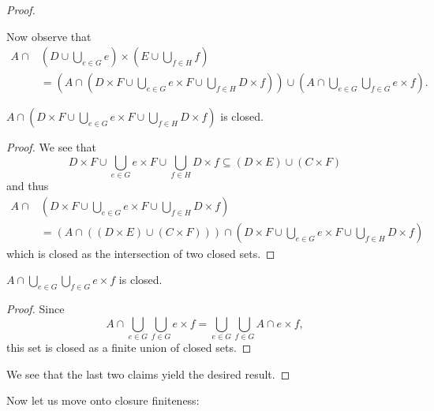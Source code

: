 \begin{proof}
\begin{claim}
    \end{claim}
    Now observe that 
    \begin{align*}
      A \cap &\left( D \cup \bigcup_{e \in G} e \right) \times \left( E \cup \bigcup_{f \in H} f\right) \\
      &= \left( A \cap \left( D \times F \cup \bigcup_{e \in G} e \times F \cup \bigcup_{f \in H} D \times f \right) \right) \cup \left( A \cap \bigcup_{e \in G} \bigcup_{f \in G} e \times f\right).
    \end{align*}
    \begin{claim}
      $A \cap \left( D \times F \cup \bigcup_{e \in G} e \times F \cup \bigcup_{f \in H} D \times f \right)$ is closed. 
      \begin{proof}
        We see that 
        \begin{equation*}
        D \times F \cup \bigcup_{e \in G} e \times F \cup \bigcup_{f \in H} D \times f \subseteq (D \times E) \cup (C \times F)
        \end{equation*}
        and thus 
        \begin{align*}
          A \cap &\left( D \times F \cup \bigcup_{e \in G} e \times F \cup \bigcup_{f \in H} D \times f \right) \\
          &= (A \cap ((D \times E) \cup (C \times F))) \cap \left( D \times F \cup \bigcup_{e \in G} e \times F \cup \bigcup_{f \in H} D \times f \right)
        \end{align*}
        which is closed as the intersection of two closed sets.
      \end{proof}
    \end{claim}
    \begin{claim}
      $A \cap \bigcup_{e \in G} \bigcup_{f \in G} e \times f$ is closed.
      \begin{proof}
        Since
        \begin{equation*}
          A \cap \bigcup_{e \in G} \bigcup_{f \in G} e \times f = \bigcup_{e \in G} \bigcup_{f \in G} A \cap e \times f,
        \end{equation*}
        this set is closed as a finite union of closed sets. 
      \end{proof}
    \end{claim}
    We see that the last two claims yield the desired result. 
\end{proof}

Now let us move onto closure finiteness: 


